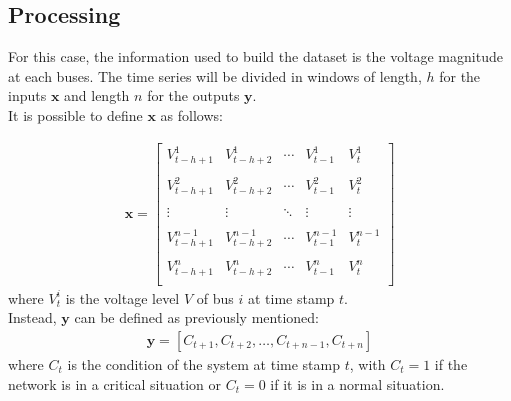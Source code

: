 \subsection{Processing}
For this case, the information used to build the dataset is the voltage magnitude at each buses. The time series will be divided in windows of length, $h$ for the inputs $\textbf{x}$ and length $n$ for the outputs $\textbf{y}$. \\

It is possible to define $\textbf{x}$ as follows:

\begin{equation}
  \begin{aligned}
    \textbf{x}  = 
        \begin{bmatrix}
        V^1_{t-h+1} & V^1_{t-h+2} & \cdots & V^1_{t-1} & V^1_{t} \\
        & & & & \\
        
        V^2_{t-h+1} & V^2_{t-h+2} & \cdots & V^2_{t-1} & V^2_{t} \\
        & & & & \\
        
        \vdots & \vdots & \ddots & \vdots & \vdots \\
        & & & & \\
        
        V^{n-1}_{t-h+1} & V^{n-1}_{t-h+2} & \cdots & V^{n-1}_{t-1} & V^{n-1}_{t} \\
        & & & & \\
        
        V^n_{t-h+1} & V^n_{t-h+2} & \cdots & V^n_{t-1} & V^n_{t} \\
        \end{bmatrix}
  \end{aligned}
\end{equation}
\noindent where $V^i_t$ is the voltage level $V$ of bus $i$ at time stamp $t$. \\

\noindent Instead, $\textbf{y}$ can be defined as previously mentioned: 
\begin{equation}
    \begin{aligned}
        \textbf{y} = [C_{t+1},C_{t+2}, \dots, C_{t+n-1},C_{t+n}]
    \end{aligned}
\end{equation}
\noindent where $C_t$ is the condition of the system at time stamp $t$, with $C_t=1$ if the network is in a critical situation or $C_t=0$ if it is in a normal situation. \\

